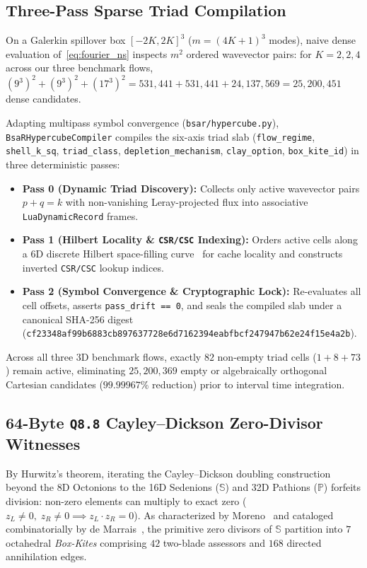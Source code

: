 \documentclass[11pt]{article}
\theoremstyle{plain}
\theoremstyle{definition}
\begin{document}
\subsection{Three-Pass Sparse Triad Compilation}
On a Galerkin spillover box $[-2K, 2K]^3$ ($m = (4K+1)^3$ modes), naive dense evaluation of~\eqref{eq:fourier_ns} inspects $m^2$ ordered wavevector pairs: for $K = 2, 2, 4$ across our three benchmark flows, $(9^3)^2 + (9^3)^2 + (17^3)^2 = 531{,}441 + 531{,}441 + 24{,}137{,}569 = 25{,}200{,}451$ dense candidates.

Adapting multipass symbol convergence (\texttt{bsar/hypercube.py}), \texttt{BsaRHypercubeCompiler} compiles the six-axis triad slab (\texttt{flow\_regime}, \texttt{shell\_k\_sq}, \texttt{triad\_class}, \texttt{depletion\_mechanism}, \texttt{clay\_option}, \texttt{box\_kite\_id}) in three deterministic passes:
\begin{itemize}
  \item \textbf{Pass 0 (Dynamic Triad Discovery):} Collects only active wavevector pairs $p + q = k$ with non-vanishing Leray-projected flux into associative \texttt{LuaDynamicRecord} frames.
  \item \textbf{Pass 1 (Hilbert Locality \& \texttt{CSR/CSC} Indexing):} Orders active cells along a 6D discrete Hilbert space-filling curve~\cite{hilbert1891} for cache locality and constructs inverted \texttt{CSR/CSC} lookup indices.
  \item \textbf{Pass 2 (Symbol Convergence \& Cryptographic Lock):} Re-evaluates all cell offsets, asserts \texttt{pass\_drift == 0}, and seals the compiled slab under a canonical SHA-256 digest (\texttt{cf23348af99b6883cb897637728e6d7162394eabfbcf247947b62e24f15e4a2b}).
\end{itemize}
Across all three 3D benchmark flows, exactly $82$ non-empty triad cells ($1 + 8 + 73$) remain active, eliminating $25{,}200{,}369$ empty or algebraically orthogonal Cartesian candidates ($99.99967\%$ reduction) prior to interval time integration.

\subsection{64-Byte \texttt{Q8.8} Cayley--Dickson Zero-Divisor Witnesses}
By Hurwitz's theorem, iterating the Cayley--Dickson doubling construction~\cite{dickson1919} beyond the 8D Octonions to the 16D Sedenions ($\mathbb{S}$) and 32D Pathions ($\mathbb{P}$) forfeits division: non-zero elements can multiply to exact zero ($z_L \neq 0,\; z_R \neq 0 \implies z_L \cdot z_R = 0$). As characterized by Moreno~\cite{moreno1998} and cataloged combinatorially by de Marrais~\cite{demarrais2000}, the primitive zero divisors of $\mathbb{S}$ partition into $7$ octahedral \emph{Box-Kites} comprising $42$ two-blade assessors and $168$ directed annihilation edges.
\end{document}
